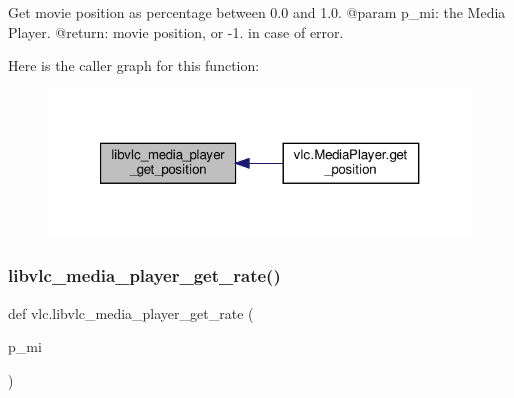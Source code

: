 \begin{DoxyVerb}Get movie position as percentage between 0.0 and 1.0.
@param p_mi: the Media Player.
@return: movie position, or -1. in case of error.
\end{DoxyVerb}
 Here is the caller graph for this function\+:
\nopagebreak
\begin{figure}[H]
\begin{center}
\leavevmode
\includegraphics[width=321pt]{namespacevlc_a1f0992a5cb5ad9dd56c91efbaa4c3804_icgraph}
\end{center}
\end{figure}
\mbox{\label{namespacevlc_a3630bafb220ea8c988c4d7c7e4a9f0a6}} 
\subsubsection{\texorpdfstring{libvlc\+\_\+media\+\_\+player\+\_\+get\+\_\+rate()}{libvlc\_media\_player\_get\_rate()}}
{\footnotesize\ttfamily def vlc.\+libvlc\+\_\+media\+\_\+player\+\_\+get\+\_\+rate (\begin{DoxyParamCaption}\item[{}]{p\+\_\+mi }\end{DoxyParamCaption})}

